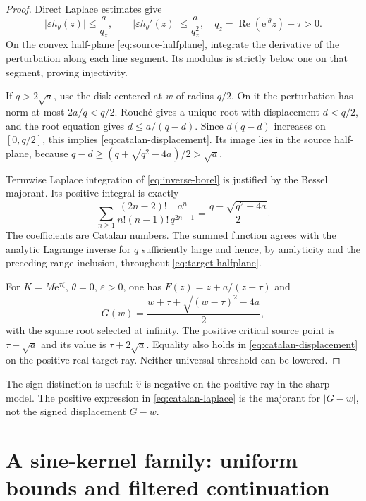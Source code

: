 \documentclass[11pt,a4paper]{article}
\numberwithin{equation}{section}
\theoremstyle{definition}
\theoremstyle{remark}
\newcommand{\ii}{\mathrm i}
\newcommand{\e}{\mathrm e}
\newcommand{\Rea}{\operatorname{Re}}
\begin{document}
\begin{proof}
Direct Laplace estimates give
\[
 |\varepsilon h_\theta(z)|\le\frac{a}{q_z},\qquad
 |\varepsilon h_\theta'(z)|\le\frac{a}{q_z^2},
 \quad q_z=\Rea(\e^{\ii\theta}z)-\tau>0.
\]
On the convex half-plane \eqref{eq:source-halfplane}, integrate the
derivative of the perturbation along each line segment. Its modulus
is strictly below one on that segment, proving injectivity.

If $q>2\sqrt a$, use the disk centered at $w$ of radius $q/2$.
On it the perturbation has norm at most $2a/q<q/2$.
Rouch\'e gives a unique root with displacement $d<q/2$, and
the root equation gives $d\le a/(q-d)$.
Since $d(q-d)$ increases on $[0,q/2]$, this implies
\eqref{eq:catalan-displacement}. Its image lies in the source
half-plane, because $q-d\ge(q+\sqrt{q^2-4a})/2>\sqrt a$.

Termwise Laplace integration of \eqref{eq:inverse-borel} is justified
by the Bessel majorant. Its positive integral is exactly
\begin{equation}\label{eq:catalan-laplace}
 \sum_{n\ge1}\frac{(2n-2)!}{n!(n-1)!}\frac{a^n}{q^{2n-1}}
 =\frac{q-\sqrt{q^2-4a}}2.
\end{equation}
The coefficients are Catalan numbers. The summed function agrees
with the analytic Lagrange inverse for $q$ sufficiently large and
hence, by analyticity and the preceding range inclusion, throughout
\eqref{eq:target-halfplane}.

For $K=M\e^{\tau\zeta}$, $\theta=0$, $\varepsilon>0$, one has
$F(z)=z+a/(z-\tau)$ and
\begin{equation}\label{eq:sharp-quadratic}
 G(w)=\frac{w+\tau+\sqrt{(w-\tau)^2-4a}}2,
\end{equation}
with the square root selected at infinity. The positive critical
source point is $\tau+\sqrt a$ and its value is $\tau+2\sqrt a$.
Equality also holds in \eqref{eq:catalan-displacement} on the
positive real target ray. Neither universal threshold can be lowered.
\end{proof}

The sign distinction is useful: $\widehat v$ is negative on the
positive ray in the sharp model. The positive expression in
\eqref{eq:catalan-laplace} is the majorant for $|G-w|$, not the
signed displacement $G-w$.

\section{A sine-kernel family: uniform bounds and filtered continuation}\label{sec:sine}
\end{document}
